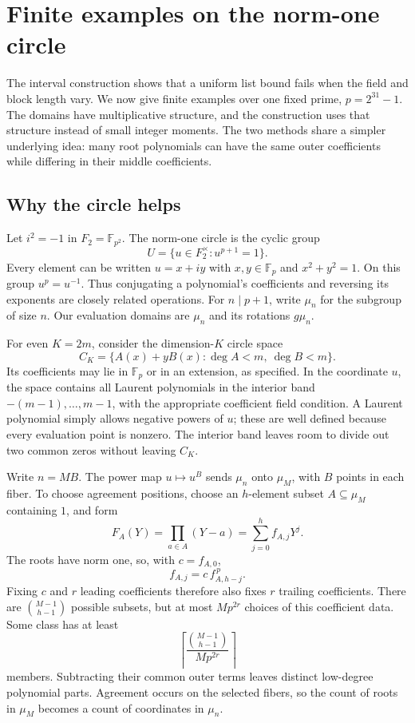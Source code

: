 \documentclass[11pt,letterpaper]{article}
\theoremstyle{definition}
\theoremstyle{remark}
\newcommand{\F}{\mathbb F}
\begin{document}
\section{Finite examples on the norm-one circle}
\label{sec:circle-overview}

The interval construction shows that a uniform list bound fails when the
field and block length vary. We now give finite examples over one fixed
prime, $p=2^{31}-1$. The domains have multiplicative structure, and the
construction uses that structure instead of small integer moments.
The two methods share a simpler underlying idea: many root polynomials
can have the same outer coefficients while differing in their middle
coefficients.

\subsection{Why the circle helps}

Let $i^2=-1$ in $F_2=\F_{p^2}$. The norm-one circle is the cyclic group
\[
 U=\{u\in F_2^\times:u^{p+1}=1\}.
\]
Every element can be written $u=x+iy$ with $x,y\in\F_p$ and
$x^2+y^2=1$. On this group $u^p=u^{-1}$. Thus conjugating a polynomial's
coefficients and reversing its exponents are closely related operations.
For $n\mid p+1$, write $\mu_n$ for the subgroup of size $n$.
Our evaluation domains are $\mu_n$ and its rotations $g\mu_n$.

For even $K=2m$, consider the dimension-$K$ circle space
\[
 C_K=\{A(x)+yB(x):\deg A<m,\ \deg B<m\}.
\]
Its coefficients may lie in $\F_p$ or in an extension, as specified.
In the coordinate $u$, the space contains all Laurent polynomials in
the interior band $-(m-1),\ldots,m-1$, with the appropriate coefficient
field condition. A Laurent polynomial simply allows negative powers
of $u$; these are well defined because every evaluation point is nonzero.
The interior band leaves room to divide out two common zeros without
leaving $C_K$.

Write $n=MB$. The power map $u\mapsto u^B$ sends $\mu_n$ onto
$\mu_M$, with $B$ points in each fiber. To choose agreement positions,
choose an $h$-element subset $A\subseteq\mu_M$ containing $1$, and form
\[
 F_A(Y)=\prod_{a\in A}(Y-a)=\sum_{j=0}^h f_{A,j}Y^j.
\]
The roots have norm one, so, with $c=f_{A,0}$,
\[
 f_{A,j}=c\,f_{A,h-j}^{\,p}.
\]
Fixing $c$ and $r$ leading coefficients therefore also fixes $r$
trailing coefficients. There are $\binom{M-1}{h-1}$ possible subsets,
but at most $Mp^{2r}$ choices of this coefficient data. Some class has
at least
\[
 \left\lceil\frac{\binom{M-1}{h-1}}{Mp^{2r}}\right\rceil
\]
members. Subtracting their common outer terms leaves distinct low-degree
polynomial parts. Agreement occurs on the selected fibers, so the count
of roots in $\mu_M$ becomes a count of coordinates in $\mu_n$.
\end{document}
